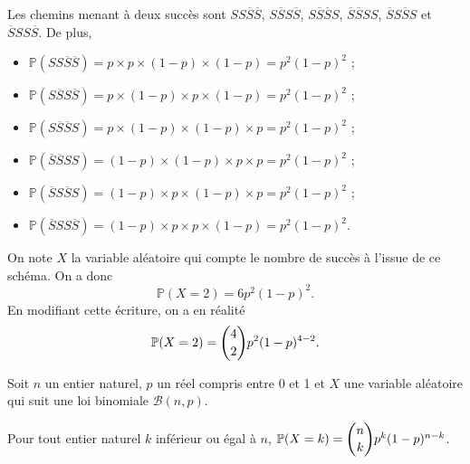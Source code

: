 \documentclass[11pt,fleqn, openany]{book} %
\begin{document}
\begin{example}
\begin{minipage}{0.4\linewidth}
\begin{center}
\end{center}
\end{minipage}\hfill\begin{minipage}{0.55\linewidth}
Les chemins menant à deux succès sont $SS\overline{S}\overline{S}$, $S\overline{S}S\overline{S}$, $S\overline{S}\overline{S}S$, $\overline{S}\overline{S}SS$, $\overline{S}S\overline{S}S$ et $\overline{S}SS\overline{S}$. De plus,

\begin{itemize}
\vskip5pt
\item $\mathbb{P}(SS\overline{S}\overline{S})=p\times p \times (1-p) \times (1-p)=p^2(1-p)^2$ ;
\vskip5pt
\item $\mathbb{P}(S\overline{S}S\overline{S})=p\times (1-p) \times p \times (1-p)=p^2(1-p)^2$ ;
\vskip5pt
\item $\mathbb{P}(S\overline{S}\overline{S}S)=p\times (1-p) \times (1-p) \times p=p^2(1-p)^2$ ;
\vskip5pt
\item $\mathbb{P}(\overline{S}\overline{S}SS)=(1-p)\times (1-p) \times p \times p=p^2(1-p)^2$ ;
\vskip5pt
\item $\mathbb{P}(\overline{S}S\overline{S}S)=(1-p)\times p \times (1-p) \times p=p^2(1-p)^2$ ;
\vskip5pt
\item $\mathbb{P}(\overline{S}SS\overline{S})=(1-p)\times p \times p \times (1-p)=p^2(1-p)^2$.
\vskip5pt
\end{itemize}
On note $X$ la variable aléatoire qui compte le nombre de succès à l'issue de ce schéma. On a donc
\[ \mathbb{P}(X=2) = 6 p^2(1-p)^2.\]
En modifiant cette écriture, on a en réalité
\[ \mathbb{P}(X=2) = \dbinom{4}{2} p^2(1-p)^{4-2}.\]
\end{minipage}
\end{example}


\begin{proposition}Soit $n$ un entier naturel, $p$ un réel compris entre 0 et 1 et $X$ une variable aléatoire qui suit une loi binomiale $\mathcal{B}(n,p)$.

Pour tout entier naturel $k$ inférieur ou égal à $n$, $\mathbb{P}(X=k)=\dbinom{n}{k}p^k(1-p)^{n-k}$.\end{proposition}
\end{document}
